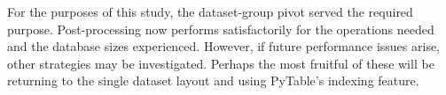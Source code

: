 For the purposes of this study, the dataset-group pivot served the required
purpose. Post-processing now performs satisfactorily for the operations needed
and the database sizes experienced. However, if future performance issues arise,
other strategies may be investigated. Perhaps the most fruitful of these will be
returning to the single dataset layout and using PyTable's indexing feature. 
